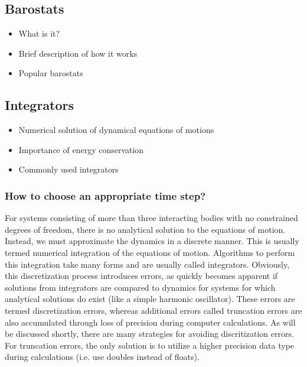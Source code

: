 \documentclass[9pt,bestpractices]{livecoms}
\begin{document}
\subsection{Barostats}
\label{sec:barostats}
\begin{itemize}
\item What is it?
\item Brief description of how it works
\item Popular barostats
\end{itemize}

\subsection{Integrators}
\label{sec:integrators}
\begin{itemize}
\item Numerical solution of dynamical equations of motions
\item Importance of energy conservation
\item Commonly used integrators
\end{itemize}
\subsubsection{How to choose an appropriate time step?}


For systems consisting of more than three interacting bodies with no constrained degrees of freedom, there is no analytical solution to the equations of motion.
Instead, we must approximate the dynamics in a discrete manner.
This is usually termed numerical integration of the equations of motion. 
Algorithms to perform this integration take many forms and are usually called integrators.
Obviously, this discretization process introduces errors, as quickly becomes apparent if solutions from integrators are compared to dynamics for systems for which analytical solutions do exist (like a simple harmonic oscillator).
These errors are termed discretization errors, whereas additional errors called truncation errors are also accumulated through loss of precision during computer calculations.
As will be discussed shortly, there are many strategies for avoiding discritization errors.
For truncation errors, the only solution is to utilize a higher precision data type during calculations (i.e. use doubles instead of floats).
\end{document}
